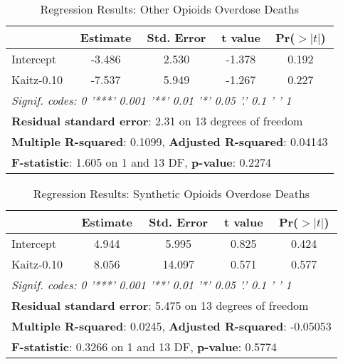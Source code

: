 \documentclass[12pt,a4paper]{article}
\begin{document}
\newpage

\begin{table}[ht]
    \centering
    \begin{tabular}{lcccc}
    \toprule
     & \textbf{Estimate} & \textbf{Std. Error} & \textbf{t value} & \textbf{Pr($>|t|$)} \\
    \midrule
    Intercept  & -3.486 & 2.530 & -1.378 & 0.192 \\
    Kaitz-0.10 & -7.537 & 5.949 & -1.267 & 0.227 \\
    \midrule
    \multicolumn{5}{l}{\textit{Signif. codes:  0 '***' 0.001 '**' 0.01 '*' 0.05 '.' 0.1 ' ' 1}} \\
    \midrule
    \multicolumn{5}{l}{\textbf{Residual standard error}: 2.31 on 13 degrees of freedom} \\
    \multicolumn{5}{l}{\textbf{Multiple R-squared}: 0.1099, \textbf{Adjusted R-squared}: 0.04143} \\
    \multicolumn{5}{l}{\textbf{F-statistic}: 1.605 on 1 and 13 DF, \textbf{p-value}: 0.2274} \\
    \bottomrule
    \end{tabular}
    \caption{Regression Results: Other Opioids Overdose Deaths}
    \label{tab:regression_results_otheropioids}
\end{table}

\begin{table}[ht]
    \centering
    \begin{tabular}{lcccc}
    \toprule
     & \textbf{Estimate} & \textbf{Std. Error} & \textbf{t value} & \textbf{Pr($>|t|$)} \\
    \midrule
    Intercept  & 4.944 & 5.995 & 0.825 & 0.424 \\
    Kaitz-0.10 & 8.056 & 14.097 & 0.571 & 0.577 \\
    \midrule
    \multicolumn{5}{l}{\textit{Signif. codes:  0 '***' 0.001 '**' 0.01 '*' 0.05 '.' 0.1 ' ' 1}} \\
    \midrule
    \multicolumn{5}{l}{\textbf{Residual standard error}: 5.475 on 13 degrees of freedom} \\
    \multicolumn{5}{l}{\textbf{Multiple R-squared}: 0.0245, \textbf{Adjusted R-squared}: -0.05053} \\
    \multicolumn{5}{l}{\textbf{F-statistic}: 0.3266 on 1 and 13 DF, \textbf{p-value}: 0.5774} \\
    \bottomrule
    \end{tabular}
    \caption{Regression Results: Synthetic Opioids Overdose Deaths}
    \label{tab:regression_results_synthetic}
\end{table}
\end{document}
